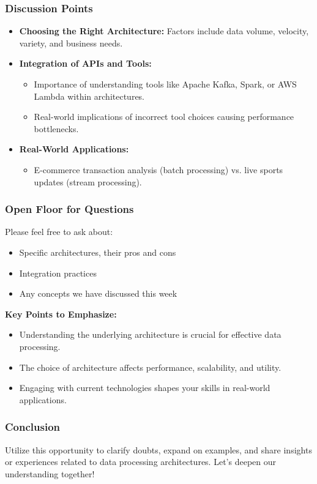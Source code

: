 \documentclass[aspectratio=169]{beamer}
\begin{document}
\begin{frame}[fragile]
  \frametitle{Discussion Points}
  \begin{itemize}
    \item \textbf{Choosing the Right Architecture:} Factors include data volume, velocity, variety, and business needs.
    \item \textbf{Integration of APIs and Tools:}
      \begin{itemize}
        \item Importance of understanding tools like Apache Kafka, Spark, or AWS Lambda within architectures.
        \item Real-world implications of incorrect tool choices causing performance bottlenecks.
      \end{itemize}
    \item \textbf{Real-World Applications:}
      \begin{itemize}
        \item E-commerce transaction analysis (batch processing) vs. live sports updates (stream processing).
      \end{itemize}
  \end{itemize}
\end{frame}

\begin{frame}[fragile]
  \frametitle{Open Floor for Questions}
  Please feel free to ask about:
  \begin{itemize}
    \item Specific architectures, their pros and cons
    \item Integration practices
    \item Any concepts we have discussed this week
  \end{itemize}
  
  \textbf{Key Points to Emphasize:}
  \begin{itemize}
    \item Understanding the underlying architecture is crucial for effective data processing.
    \item The choice of architecture affects performance, scalability, and utility.
    \item Engaging with current technologies shapes your skills in real-world applications.
  \end{itemize}
\end{frame}

\begin{frame}[fragile]
  \frametitle{Conclusion}
  Utilize this opportunity to clarify doubts, expand on examples, and share insights or experiences related to data processing architectures. Let's deepen our understanding together!
\end{frame}
\end{document}
